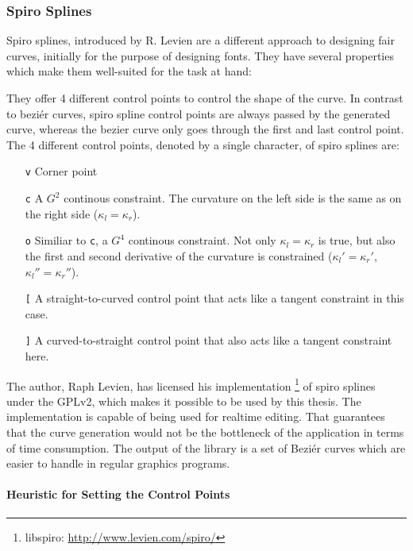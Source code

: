 \subsubsection{Spiro Splines}

Spiro splines, introduced by R. Levien \cite{levien2009spiral} are a different approach to designing fair curves, initially for the purpose of designing fonts. They have several properties which make them well-suited for the task at hand:

They offer 4 different control points to control the shape of the curve. In contrast to beziér curves, spiro spline control points are always passed by the generated curve, whereas the bezier curve only goes through the first and last control point. The 4 different control points, denoted by a single character, of spiro splines are:

\begin{itemize}
\item[\texttt{v}] Corner point
\item[\texttt{c}] A $G^2$ continous constraint. The curvature  on the left side is the same as on the right side ($\kappa_l = \kappa_r$).
\item[\texttt{o}] Similiar to \texttt{c}, a $G^4$ continous constraint. Not only $\kappa_l = \kappa_r$ is true, but also the first and second derivative of the curvature is constrained ($\kappa_l' = \kappa_r'$, $\kappa_l'' = \kappa_r''$).
\item[\texttt{[}] A straight-to-curved control point that acts like a tangent constraint in this case.
\item[\texttt{]}] A curved-to-straight control point that also acts like a tangent constraint here.
\end{itemize}

The author, Raph Levien, has licensed his implementation \footnote{libspiro: \url{http://www.levien.com/spiro/} } of spiro splines under the GPLv2, which makes it possible to be used by this thesis. The implementation is capable of being used for realtime editing. That guarantees that the curve generation would not be the bottleneck of the application in terms of time consumption. The output of the library is a set of Beziér curves which are easier to handle in regular graphics programs.

\paragraph{Heuristic for Setting the Control Points}

